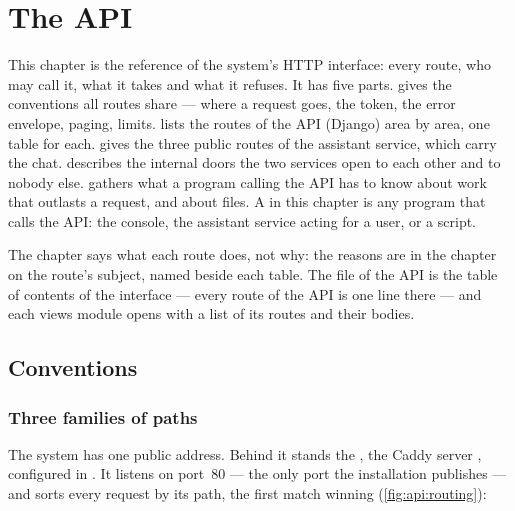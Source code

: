 \chapter{The API}\label{ch:api}

\providecommand{\apiroute}[2]{\multicolumn{2}{@{}l@{}}{\route{#1}{#2}}\\*}

This chapter is the reference of the system's HTTP interface: every route, who may call it, what
it takes and what it refuses. It has five parts.  gives the
conventions all routes share --- where a request goes, the token, the error envelope, paging,
limits.  lists the routes of the API (Django) area by area, one table for
each.  gives the three public routes of the assistant service, which
carry the chat.  describes the internal doors the two services open to
each other and to nobody else.  gathers what a program calling the API has
to know about work that outlasts a request, and about files. A  in this chapter is
any program that calls the API: the console, the assistant service acting for a user, or a
script.

The chapter says what each route does, not why: the reasons are in the chapter on the route's
subject, named beside each table. The file  of the API is the table of contents
of the interface --- every route of the API is one line there --- and each views module opens
with a list of its routes and their bodies.


\section{Conventions}\label{sec:api:conventions}

\subsection{Three families of paths}\label{sec:api:families}

The system has one public address. Behind it stands the , the Caddy server
, configured in . It listens on port~80 ---
the only port the installation publishes --- and sorts every request by its path, the first
match winning (\cref{fig:api:routing}):

